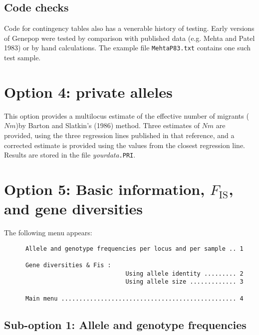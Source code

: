 \documentclass[12pt,]{book}
\theoremstyle{definition}
\theoremstyle{definition}
\theoremstyle{definition}
\theoremstyle{remark}
\begin{document}
\subsection{Code checks}\label{code-checks-2}

 Code for contingency tables also has a venerable
history of testing. Early versions of Genepop were tested by comparison
with published data (e.g. Mehta and Patel 1983) or by hand calculations.
The example file \texttt{MehtaP83.txt} contains one such test sample.

\section{Option 4: private alleles}\label{option-4-private-alleles}

This option provides a multilocus estimate of the effective number of
migrants (\(Nm\))by Barton and Slatkin's (1986) method. Three estimates
of \(Nm\) are provided, using the three regression lines published in
that reference, and a corrected estimate is provided using the values
from the closest regression line. Results are stored in the file
\emph{yourdata}\texttt{.PRI}.

\section{\texorpdfstring{Option 5: Basic information, \(F_\mathrm{IS}\),
and gene
diversities}{Option 5: Basic information, F\_\textbackslash{}mathrm\{IS\}, and gene diversities}}\label{option-5-basic-information-f_mathrmis-and-gene-diversities}

The following menu appears:

\begin{verbatim}
      Allele and genotype frequencies per locus and per sample .. 1

      Gene diversities & Fis :
                                  Using allele identity ......... 2
                                  Using allele size ............. 3

      Main menu ................................................. 4
\end{verbatim}

\subsection{Sub-option 1: Allele and genotype
frequencies}\label{sub-option-1-allele-and-genotype-frequencies}
\end{document}
